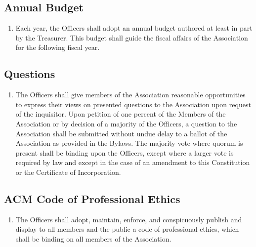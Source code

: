 \subsection{Annual Budget}
\begin{enumerate}
	\item Each year, the Officers shall adopt an annual budget authored at least in part by the Treasurer. This budget shall guide the fiscal affairs of the Association for the following fiscal year.
\end{enumerate}

\subsection{Questions}
\begin{enumerate}
	\item The Officers shall give members of the Association reasonable opportunities to express their views on presented questions to the Association upon request of the inquisitor. Upon petition of one percent of the Members of the Association or by decision of a majority of the Officers, a question to the Association shall be submitted without undue delay to a ballot of the Association as provided in the Bylaws. The majority vote where quorum is present shall be binding upon the Officers, except where a larger vote is required by law and except in the case of an amendment to this Constitution or the Certificate of Incorporation.
\end{enumerate}

\subsection{ACM Code of Professional Ethics}
\begin{enumerate}
	\item The Officers shall adopt, maintain, enforce, and conspicuously publish and display to all members and the public a code of professional ethics, which shall be binding on all members of the Association.
\end{enumerate}

